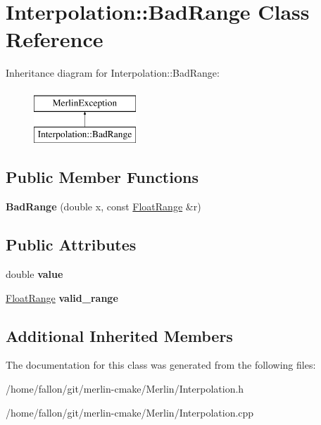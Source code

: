 \hypertarget{classInterpolation_1_1BadRange}{}\section{Interpolation\+:\+:Bad\+Range Class Reference}
\label{classInterpolation_1_1BadRange}
Inheritance diagram for Interpolation\+:\+:Bad\+Range\+:\begin{figure}[H]
\begin{center}
\leavevmode
\includegraphics[height=2.000000cm]{classInterpolation_1_1BadRange}
\end{center}
\end{figure}
\subsection*{Public Member Functions}
\begin{DoxyCompactItemize}
\item 
\mbox{\label{classInterpolation_1_1BadRange_a2ee312bf850dbd51ff47d7114644efb3}} 
{\bfseries Bad\+Range} (double x, const \hyperlink{classNumericalRange}{Float\+Range} \&r)
\end{DoxyCompactItemize}
\subsection*{Public Attributes}
\begin{DoxyCompactItemize}
\item 
\mbox{\label{classInterpolation_1_1BadRange_a2c2abea652f02f8858eaa6c290674785}} 
double {\bfseries value}
\item 
\mbox{\label{classInterpolation_1_1BadRange_a10104044db3ab00fb715e68a7c28627a}} 
\hyperlink{classNumericalRange}{Float\+Range} {\bfseries valid\+\_\+range}
\end{DoxyCompactItemize}
\subsection*{Additional Inherited Members}


The documentation for this class was generated from the following files\+:\begin{DoxyCompactItemize}
\item 
/home/fallon/git/merlin-\/cmake/\+Merlin/Interpolation.\+h\item 
/home/fallon/git/merlin-\/cmake/\+Merlin/Interpolation.\+cpp\end{DoxyCompactItemize}

